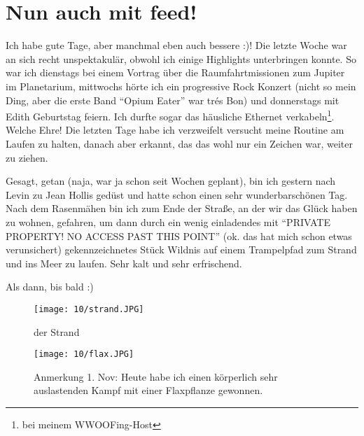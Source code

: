 \chapter{Nun auch mit feed!}

Ich habe gute Tage, aber manchmal eben auch bessere :)! Die letzte
Woche war an sich recht unspektakulär, obwohl ich einige Highlights
unterbringen konnte. So war ich dienstags bei einem Vortrag über die
Raumfahrtmissionen zum Jupiter im Planetarium, mittwochs hörte ich ein
progressive Rock Konzert (nicht so mein Ding, aber die erste Band
``Opium Eater'' war trés Bon) und donnerstags mit Edith Geburtstag
feiern. Ich durfte sogar das häusliche Ethernet verkabeln\footnote{bei
meinem WWOOFing-Host}. Welche Ehre!  Die letzten Tage habe ich
verzweifelt versucht meine Routine am Laufen zu halten, danach aber
erkannt, das das wohl nur ein Zeichen war, weiter zu ziehen.

Gesagt, getan (naja, war ja schon seit Wochen geplant), bin ich gestern
nach Levin zu Jean Hollis gedüst und hatte schon einen sehr
wunderbarschönen Tag. Nach dem Rasenmähen bin ich zum Ende der Straße,
an der wir das Glück haben zu wohnen, gefahren, um dann durch ein wenig
einladendes mit ``PRIVATE PROPERTY! NO ACCESS PAST THIS POINT'' (ok. das
hat mich schon etwas verunsichert) gekennzeichnetes Stück Wildnis auf
einem Trampelpfad zum Strand und ins Meer zu laufen. Sehr kalt und sehr
erfrischend.

Als dann, bis bald :)

\begin{figure}[h]
  \centering
  \texttt{[image: 10/strand.JPG]}
  \caption*{der Strand}
\end{figure}
\begin{figure}[h]
  \centering
  \texttt{[image: 10/flax.JPG]}
  \caption*{Anmerkung 1. Nov: Heute habe ich einen körperlich sehr auslastenden
Kampf mit einer Flaxpflanze gewonnen.}
\end{figure}
